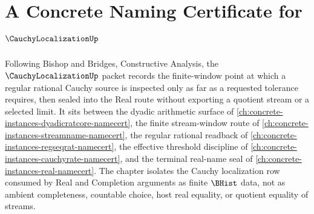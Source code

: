 \chapter{A Concrete Naming Certificate for $\CauchyLocalizationUp$}
\label{ch:concrete-instances-cauchy-localization-namecert}

Following Bishop and Bridges, Constructive Analysis, the $\CauchyLocalizationUp$ packet records the finite-window point at which a regular rational Cauchy source is inspected only as far as a requested tolerance requires, then sealed into the Real route without exporting a quotient stream or a selected limit. It sits between the dyadic arithmetic surface of \autoref{ch:concrete-instances-dyadicratcore-namecert}, the finite stream-window route of \autoref{ch:concrete-instances-streamname-namecert}, the regular rational readback of \autoref{ch:concrete-instances-regseqrat-namecert}, the effective threshold discipline of \autoref{ch:concrete-instances-cauchyrate-namecert}, and the terminal real-name seal of \autoref{ch:concrete-instances-real-namecert}. The chapter isolates the Cauchy localization row consumed by Real and Completion arguments as finite $\BHist$ data, not as ambient completeness, countable choice, host real equality, or quotient equality of streams.

